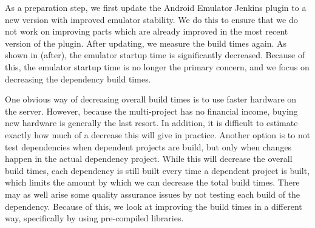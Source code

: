 As a preparation step, we first update the Android Emulator Jenkins plugin to a new version with improved emulator stability. We do this to ensure that we do not work on improving parts which are already improved in the most recent version of the plugin. After updating, we measure the build times again. As shown in  (after), the emulator startup time is significantly decreased. Because of this, the emulator startup time is no longer the primary concern, and we focus on decreasing the dependency build times.

One obvious way of decreasing overall build times is to use faster hardware on the server. However, because the multi-project has no financial income, buying new hardware is generally the last resort. In addition, it is difficult to estimate exactly how much of a decrease this will give in practice. Another option is to not test dependencies when dependent projects are build, but only when changes happen in the actual dependency project. While this will decrease the overall build times, each dependency is still built every time a dependent project is built, which limits the amount by which we can decrease the total build times. There may as well arise some quality assurance issues by not testing each build of the dependency. Because of this, we look at improving the build times in a different way, specifically by using pre-compiled libraries.

